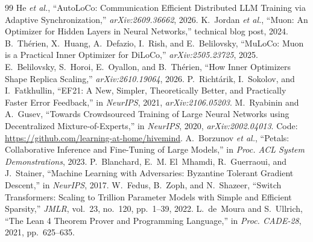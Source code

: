 \documentclass[11pt,a4paper]{article}
\begin{document}
\begin{thebibliography}{99}
 He \textit{et al.}, ``AutoLoCo: Communication Efficient Distributed LLM Training via Adaptive Synchronization,'' \textit{arXiv:2609.36662}, 2026.
 K.~Jordan \textit{et al.}, ``Muon: An Optimizer for Hidden Layers in Neural Networks,'' technical blog post, 2024.
 B.~Th\'erien, X.~Huang, A.~Defazio, I.~Rish, and E.~Belilovsky, ``MuLoCo: Muon is a Practical Inner Optimizer for DiLoCo,'' \textit{arXiv:2505.23725}, 2025.
 E.~Belilovsky, S.~Horoi, E.~Oyallon, and B.~Th\'erien, ``How Inner Optimizers Shape Replica Scaling,'' \textit{arXiv:2610.19064}, 2026.
 P.~Richt\'arik, I.~Sokolov, and I.~Fatkhullin, ``EF21: A New, Simpler, Theoretically Better, and Practically Faster Error Feedback,'' in \textit{NeurIPS}, 2021, \textit{arXiv:2106.05203}.
 M.~Ryabinin and A.~Gusev, ``Towards Crowdsourced Training of Large Neural Networks using Decentralized Mixture-of-Experts,'' in \textit{NeurIPS}, 2020, \textit{arXiv:2002.04013}. Code: \url{https://github.com/learning-at-home/hivemind}.
 A.~Borzunov \textit{et al.}, ``Petals: Collaborative Inference and Fine-Tuning of Large Models,'' in \textit{Proc. ACL System Demonstrations}, 2023.
 P.~Blanchard, E.~M. El~Mhamdi, R.~Guerraoui, and J.~Stainer, ``Machine Learning with Adversaries: Byzantine Tolerant Gradient Descent,'' in \textit{NeurIPS}, 2017.
 W.~Fedus, B.~Zoph, and N.~Shazeer, ``Switch Transformers: Scaling to Trillion Parameter Models with Simple and Efficient Sparsity,'' \textit{JMLR}, vol.~23, no.~120, pp.~1--39, 2022.
 L.~de~Moura and S.~Ullrich, ``The Lean 4 Theorem Prover and Programming Language,'' in \textit{Proc. CADE-28}, 2021, pp.~625--635.
\end{thebibliography}
\end{document}
